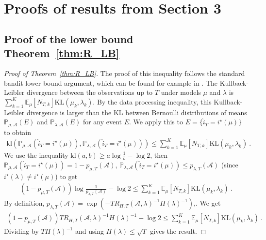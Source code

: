\documentclass{article}
\newcommand{\KL}{\mathrm{KL}}
\newcommand{\kl}{\mathrm{kl}}
\begin{document}
\section{Proofs of results from Section 3}
\label{sec:proofs_relative_to_section_sec:main_tool}

\subsection{Proof of the lower bound Theorem~\ref{thm:R_LB}}
\label{sub:main_theorem}

\begin{proof}[Proof of Theorem~\ref{thm:R_LB}]
The proof of this inequality follows the standard bandit lower bound argument, which can be found for example in \cite{garivier2019explore}.
The Kullback-Leibler divergence between the observations up to $T$ under models $\mu$ and $\lambda$ is $\sum_{k=1}^K \mathbb{E}_\mu[N_{T,k}] \KL(\mu_k, \lambda_k)$.
By the data processing inequality, this Kullback-Leibler divergence is larger than the KL between Bernoulli distributions of means $\mathbb{P}_{\mu, \mathcal A}(E)$ and $\mathbb{P}_{\lambda, \mathcal A}(E)$ for any event $E$. We apply this to $E = \{\hat{i}_T = i^\star(\mu)\}$ to obtain
\begin{align*}
\kl(\mathbb{P}_{\mu, \mathcal A}(\hat{i}_T = i^\star(\mu)), \mathbb{P}_{\lambda, \mathcal A}(\hat{i}_T = i^\star(\mu)))
\le \sum_{k=1}^K \mathbb{E}_\mu[N_{T,k}] \KL(\mu_k, \lambda_k)
\: .
\end{align*}
We use the inequality $\kl(a, b) \ge a \log \frac{1}{b} - \log 2$, then $\mathbb{P}_{\mu, \mathcal A}(\hat{i}_T = i^\star(\mu)) = 1 - p_{\mu, T}(\mathcal A)$, $\mathbb{P}_{\lambda, \mathcal A}(\hat{i}_T = i^\star(\mu)) \le p_{\lambda, T}(\mathcal A)$ (since $i^\star(\lambda) \ne i^\star(\mu)$) to get
\begin{align*}
(1 - p_{\mu, T}(\mathcal A)) \log \frac{1}{p_{\lambda, T}(\mathcal A)} - \log 2
\le \sum_{k=1}^K \mathbb{E}_\mu[N_{T,k}] \KL(\mu_k, \lambda_k)
\: .
\end{align*}
By definition, $p_{\lambda, T}(\mathcal A) = \exp(-T R_{H,T}(\mathcal A, \lambda)^{-1} H(\lambda)^{-1})$,. We get
\begin{align*}
(1 - p_{\mu, T}(\mathcal A)) T R_{H,T}(\mathcal A, \lambda)^{-1} H(\lambda)^{-1} - \log 2
\le \sum_{k=1}^K \mathbb{E}_\mu[N_{T,k}] \KL(\mu_k, \lambda_k)
\: .
\end{align*}
Dividing by $T H(\lambda)^{-1}$ and using $H(\lambda) \le \sqrt{T}$ gives the result.
\end{proof}
\end{document}
